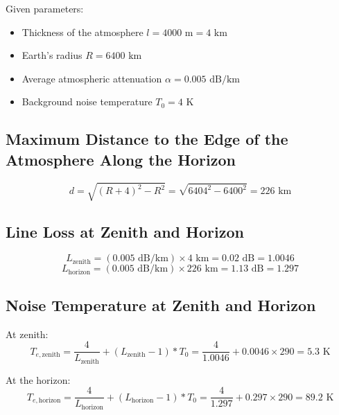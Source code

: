 \documentclass[cn,12pt]{homework}
\begin{document}
\begin{solution}
  Given parameters:
\begin{itemize}
    \item Thickness of the atmosphere \( l = 4000 \text{ m} = 4 \text{ km} \)
    \item Earth's radius \( R = 6400 \text{ km} \)
    \item Average atmospheric attenuation \( \alpha = 0.005 \text{ dB/km} \)
    \item Background noise temperature \( T_0 = 4 \text{ K} \)
\end{itemize}

\subsection*{Maximum Distance to the Edge of the Atmosphere Along the Horizon}
\[ d = \sqrt{(R+4)^2 - R^2} = \sqrt{6404^2 - 6400^2} = 226 \text{ km} \]

\subsection*{Line Loss at Zenith and Horizon}
\[ L_{\text{zenith}} = (0.005 \text{ dB/km}) \times 4 \text{ km} = 0.02 \text{ dB} =1.0046 \]
\[ L_{\text{horizon}} = (0.005 \text{ dB/km}) \times 226 \text{ km} = 1.13 \text{ dB} =1.297 \]

\subsection*{Noise Temperature at Zenith and Horizon}
At zenith:
\[ T_{e,\text{zenith}} = \frac{4}{L_{\text{zenith}}} +(L_{\text{zenith}}-1) * T_0 = \frac{4}{1.0046} + 0.0046 \times 290 =5.3 \text{ K} \]

At the horizon:
\[ T_{e,\text{horizon}} = \frac{4}{L_{\text{horizon}}} +(L_{\text{horizon}}-1) * T_0 = \frac{4}{1.297} + 0.297 \times 290 = 89.2 \text{ K} \]
\end{solution}
\newpage
\end{document}
